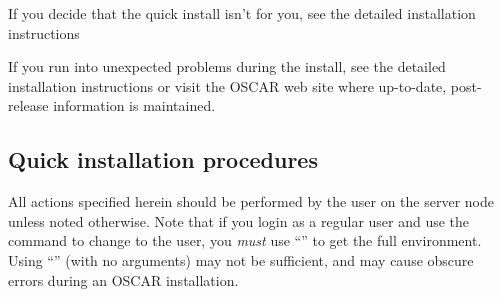 \docswitch{}{}

If you decide that the quick install isn't for you, see the detailed
installation instructions 

\begchange

If you run into unexpected problems during the install, see the
detailed installation instructions or visit the OSCAR web site where
up-to-date, post-release information is maintained.

\endchange


\subsection{Quick installation procedures}

All actions specified herein should be performed by the 
user on the server node unless noted otherwise.  Note that if you
login as a regular user and use the  command to change to the
 user, you {\em must} use ``'' to get the full
 environment.  Using ``'' (with no arguments) may
not be sufficient, and may cause obscure errors during an OSCAR
installation.

